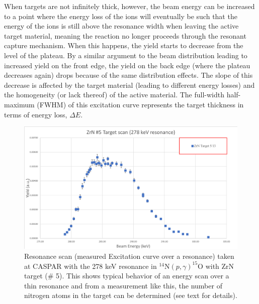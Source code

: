 When targets are not infinitely thick, however, the beam energy can be increased to a point where the energy loss of the ions will eventually be such that the energy of the ions is still above the resonance width when leaving the active target material, meaning the reaction no longer proceeds through the resonant capture mechanism. When this happens, the yield starts to decrease from the level of the plateau. By a similar argument to the beam distribution leading to increased yield on the front edge, the yield on the back edge (where the plateau decreases again) drops because of the same distribution effects. The slope of this decrease is affected by the target material (leading to different energy losses) and the homogeneity (or lack thereof) of the active material. The full-width half-maximum (FWHM) of this excitation curve represents the target thickness in terms of energy loss, $\Delta E$. 



\begin{figure}
		\includegraphics[width=1.0\linewidth]{figures/resScan.png}
	\caption{Resonance scan (measured Excitation curve over a resonance) taken at CASPAR with the 278 keV resonance in $^{14}$N$\left( p,\gamma \right) ^{15}$O with ZrN target (\# 5). This shows typical behavior of an energy scan over a thin resonance and from a measurement like this, the number of nitrogen atoms in the target can be determined (see text for details).}
	\label{fig: yieldRes}
\end{figure}



